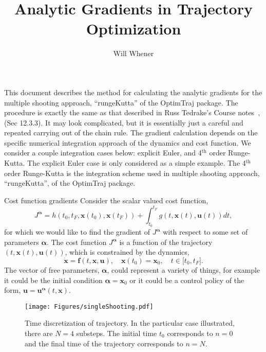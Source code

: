 \documentclass[onecolumn,11pt]{article}
\title{Analytic Gradients in Trajectory Optimization}
\author{Will Whener}
\makeatletter
\newcommand{\bs}{\boldsymbol}
\def\section{\@startsection {section}{1}{\z@}{24pt plus 2pt minus 2pt}
{12pt plus 2pt minus 2pt}{\large\bf\color{RoyalBlue}}}
\makeatother
\begin{document}
\maketitle

This document describes the method for calculating the analytic gradients for the multiple shooting approach, ``rungeKutta'' of the OptimTraj package. The procedure is exactly the same as that described in Russ Tedrake's Course notes~\cite{tedrakeNotes},(Sec 12.3.3). It may look complicated, but it is essentially just a careful and repeated carrying out of the chain rule. The gradient calculation depends on the specific numerical integration approach of the dynamics and cost function. We consider a couple integration cases below: explicit Euler, and 4$^{\text{th}}$ order Runge-Kutta. The explicit Euler case is only considered as a simple example. The 4$^{\text{th}}$ order Runge-Kutta is the integration scheme used in multiple shooting approach, ``rungeKutta'', of the OptimTraj package.

\section{Cost function gradients}
Consider the scalar valued cost function,
\begin{equation}
J^{\bs \alpha} = h(t_0,t_F,\bs x(t_0),\bs x(t_F)) + \int_{t_0}^{t_F}  g(t, \bs x(t), \bs u(t)) dt,
\label{eq:Cost}
\end{equation}
for which we would like to find the gradient of $J^{\bs \alpha}$ with respect to some set of parameters $\bs \alpha$. The cost function $J^{\bs \alpha}$ is a function of the trajectory $(t,\bs x(t),\bs u(t))$, which is constrained by the dynamics,
\begin{equation}
\dot{\bs x} =\bs f(t,\bs x,\bs u), \quad \bs x(t_0) = \bs x_0, \quad t \in \lbrack t_0, t_F\rbrack.
\label{eq:dynamics}
\end{equation}
The vector of free parameters, $\bs \alpha$, could represent a variety of things, for example it could be the initial condition $\bs \alpha = \bs x_0$ or it could be a control policy of the form, $\bs u = \bs u^{\bs \alpha}(t,\bs x)$.

\begin{figure}[h]
\centering
\hspace{0mm}
\texttt{[image: Figures/singleShooting.pdf]}
\vspace{-2mm} 
\caption{Time discretization of trajectory. In the particular case illustrated, there are $N=4$ substeps. The initial time $t_0$ corresponds to $n=0$ and the final time of the trajectory corresponds to $n=N$.}
\label{fig:singleShoot}
\end{figure}
\end{document}
